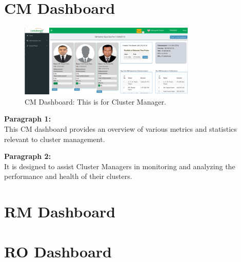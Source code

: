 \documentclass{article}
\begin{document}
\section{CM Dashboard}
\lipsum[5-6] %

\begin{figure}[h]
  \centering
  \includegraphics[width=0.75\textwidth]{image/cm_dashboard_image.png}
  \caption{CM Dashboard: This is for Cluster Manager.}
\end{figure}

\textbf{Paragraph 1:} \\
This CM dashboard provides an overview of various metrics and statistics relevant to cluster management.

\textbf{Paragraph 2:} \\
It is designed to assist Cluster Managers in monitoring and analyzing the performance and health of their clusters.






\section{RM Dashboard}
\lipsum[5-6] %


\section{RO Dashboard}
\lipsum[5-6] %
\end{document}
